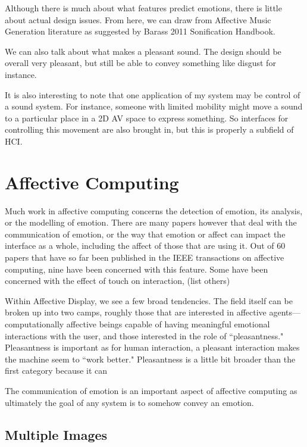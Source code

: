 Although there is much about what features predict emotions, there is little about actual design issues.  From here, we can draw from Affective Music Generation literature as suggested by Barass 2011 Sonification Handbook.  

We can also talk about what makes a pleasant sound.  The design should be overall very pleasant, but still be able to convey something like disgust for instance.

It is also interesting to note that one application of my system may be control of a sound system.  For instance, someone with limited mobility might move a sound to a particular place in a 2D AV space to express something.  So interfaces for controlling this movement are also brought in, but this is properly a subfield of HCI. 


\section{Affective Computing}

Much work in affective computing concerns the detection of emotion, its analysis, or the modelling of emotion.  There are many papers however that deal with the communication of emotion, or the way that emotion or affect can impact the interface as a whole, including the affect of those that are using it.  Out of 60 papers that have so far been published in the IEEE transactions on affective computing,  nine have been concerned with this feature.  Some have been concerned with the effect of touch on interaction, (list others)

Within Affective Display, we see a few broad tendencies.  The field itself can be broken up into two camps, roughly those that are interested in affective agents---computationally affective beings capable of having meaningful emotional interactions with the user, and those interested in the role of ``pleasantness."  Pleasantness is important as for human interaction, a pleasant interaction makes the machine seem to  ``work better."  Pleasantness is a little bit broader than the first category because it can  


The communication of emotion is an important aspect of affective computing as ultimately the goal of any system is to somehow convey an emotion.  







\subsection{Multiple Images}

